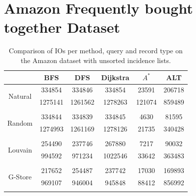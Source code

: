 \section*{Amazon Frequently bought together Dataset}
\begin{table}[H]
	\begin{center}
		 \begin{tabular}[c]{c c c c c c} \toprule
			  & BFS & DFS & Dijkstra & $A^*$  & ALT \\ \midrule 
 			\multirow{2}{*}{Natural}  & 334854 & 334846 & 334854 & 23591 & 206718 \\ 
 				 & 1275141 & 1261562 & 1278263 & 121074 & 859489 \\ 
 				&&&&& \\[-0.5em]
 			\multirow{2}{*}{Random}  & 334844 & 334839 & 334845 & 4630 & 81595 \\ 
 				 & 1274993 & 1261169 & 1278126 & 21735 & 340428 \\ 
 				&&&&& \\[-0.5em]
 			\multirow{2}{*}{Louvain}  & 254490 & 237746 & 267880 & 7217 & 90032 \\ 
 				 & 994592 & 971234 & 1022546 & 33642 & 363483 \\ 
 				&&&&& \\[-0.5em]
 			\multirow{2}{*}{G-Store}  & 217652 & 254487 & 237742 & 17030 & 169893 \\ 
 				 & 969107 & 946004 & 945848 & 88412 & 856992 \\ 
 				&&&&& \\[-0.5em]
 					\end{tabular}  
  	 \end{center}
	 \caption{Comparison of IOs per method, query and record type on the Amazon dataset with unsorted incidence lists.}
	 \label{amazon-uns}
\end{table}

